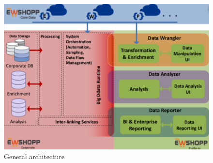  
\begin{figure}[t]
\centering
\includegraphics[width=\columnwidth]{figs/Architecture.pdf}
\caption{General architecture}
\label{fig:architecture} 
\end{figure}  








 
